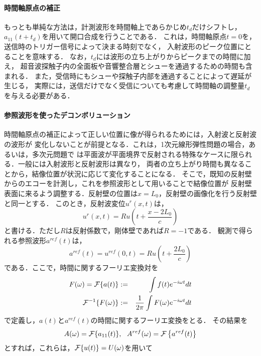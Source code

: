 \paragraph{時間軸原点の補正}
もっとも単純な方法は，計測波形を時間軸上であらかじめ$t_d$だけシフトし，
$a_{11}(t+t_d)$を用いて開口合成を行うことである．
これは，時間軸原点$t=0$を，送信時のトリガー信号によって決まる時刻でなく，
入射波形のピーク位置にとることを意味する．
なお，$t_d$には波形の立ち上がりからピークまでの時間に加え，
超音波探触子内の全面板や音響整合層とシューを通過するための時間も含まれる．
また，受信時にもシューや探触子内部を通過することによって遅延が生じる，
実際には，送信だけでなく受信についても考慮して時間軸の調整量$t_d$を与える必要がある．
\paragraph{参照波形を使ったデコンボリューション}
時間軸原点の補正によって正しい位置に像が得られるためには，入射波と反射波の波形が
変化しないことが前提となる．これは，1次元線形弾性問題の場合，あるいは，多次元問題で
は平面波が平面境界で反射される特殊なケースに限られる．一般には入射波形と反射波形は異なり，
両者の立ち上がり時間も異なることから，結像位置が状況に応じて変化することになる．
そこで，既知の反射壁からのエコーを計測し，これを参照波形として用いることで結像位置が
反射壁表面に来るよう調整する．反射壁の位置は$x=L_0$，反射壁の画像化を行う反射壁と同一とする．
このとき，反射波変位$u^{r}(x,t)$は，
\begin{equation}
	u^{r}(x,t)=Ru\left(t+\frac{x-2L_0}{c}\right)
	\label{eqn:XXX_14}
\end{equation}
と書ける．ただし$R$は反射係数で，剛体壁であれば$R=-1$である．
観測で得られる参照波形$a^{ref}(t)$は，
\begin{equation}
	a^{ref}(t)=u^{ref}(0,t)=
	Ru\left(t+\frac{2L_0}{c}\right)
	\label{eqn:XXX_15}
\end{equation}
である．ここで，時間に関するフーリエ変換対を
\begin{eqnarray}
	F(\omega)={\cal F}\{ a(t)\} &:=&  \int f(t)e^{-i\omega t} dt \\
	{\cal F}^{-1}\{ F(\omega)\} &:=&  \frac{1}{2\pi} \int F(\omega)e^{-i\omega t} dt 
\end{eqnarray}
で定義し，$a(t)$と$a^{ref}(t)$の時間に関するフーリエ変換をとる．
その結果を
\begin{equation}
	A(\omega)={\cal F}\{a_{11}(t)\}, \ \ 
	A^{ref}(\omega)={\cal F}\left\{ a^{ref}(t)\right\}
	\label{eqn:XXX_16}
\end{equation}
とすれば，これらは，${\cal F}\{ u(t)\}=U(\omega)$を用いて
